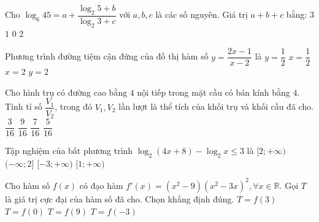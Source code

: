 \begin{ex}%
Cho $\log_6 45=a+\dfrac{\log_2 5+b}{\log_2 3+c}$ với $a, b, c$ là các số nguyên. Giá trị $a+b+c$ bằng:
\choice
{$3$}
{\True $1$}
{$0$}
{$2$} 
\end{ex}
\begin{ex}%
{
}

\end{ex}
\begin{ex}%
Phương trình đường tiệm cận đứng của đồ thị hàm số $y=\dfrac{2 x-1}{x-2}$ là
\choice
{$y=\dfrac{1}{2}$}
{$x=\dfrac{1}{2}$}
{\True $x=2$}
{$y=2$}

\end{ex}
\begin{ex}%
Cho hình trụ có đường cao bằng $4$ nội tiếp trong mặt cầu có bán kính bằng $4$. Tính tỉ số $\dfrac{V_1}{V_2}$, trong đó $V_1, V_2$ lần lượt là thể tích của khối trụ và khối cầu đã cho.
\choice
{$\dfrac{3}{16}$}
{\True $\dfrac{9}{16}$}
{$\dfrac{7}{16}$}
{$\dfrac{5}{16}$}

\end{ex}
\begin{ex}%
Tập nghiệm của bất phương trình $\log_2(4 x+8)-\log_2 x \leq 3$ là
\choice
{\True $[2;+\infty)$}
{$(-\infty; 2]$}
{$[-3;+\infty)$}
{$[1;+\infty)$}

\end{ex}
\begin{ex}%
Cho hàm số $f(x)$ có đạo hàm $f'(x)=\left(x^2-9\right)\left(x^2-3 x\right)^2, \forall x \in \mathbb{R}$. Gọi $T$ là giá trị cực đại của hàm số đã cho. Chọn khẳng định đúng.
\choice
{$T=f(3)$}
{$T=f(0)$}
{$T=f(9)$}
{\True $T=f(-3)$}

\end{ex}
